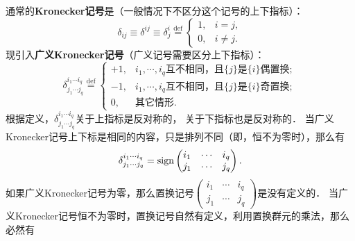 通常的{\bfseries Kronecker记号}是（一般情况下不区分这个记号的上下指标）：
\begin{equation}\label{chmla:eqn_ukd}
    \delta_{ij}\equiv \delta^{ij} \equiv \delta_{j}^{i} \overset{\mathrm {def}}{=}
    \begin{cases}
        1, & i=j, \\
        0, & i\neq j.
    \end{cases}
\end{equation}
现引入{\bfseries 广义Kronecker记号}（广义记号需要区分上下指标）： 
\begin{equation}\label{chmla:eqn_gkd}
    \delta_{j_1 \cdots j_q}^{i_1 \cdots i_q} \overset{\mathrm {def}}{=}
    \begin{cases}
        +1, & \text{$i_1,  \cdots, i_q$互不相同，且$\{ j\} $是$\{i\}$偶置换}; \\
        -1, & \text{$i_1,  \cdots, i_q$互不相同，且$\{ j\} $是$\{i\}$奇置换}; \\
        0,  & \text{其它情形}.
    \end{cases}
\end{equation}
根据定义，$\delta_{j_1 \cdots j_q}^{i_1 \cdots i_q}$关于上指标是反对称的，
关于下指标也是反对称的．
当广义Kronecker记号上下标是相同的内容，只是排列不同（即，恒不为零时），那么有
\begin{equation}\label{chmla:eqn_sign-p}
    \delta_{j_1 \cdots j_q}^{i_1 \cdots i_q} =
    {\rm sign}\begin{pmatrix}
        i_1 &\cdots &i_q \\ j_1 &\cdots &j_q
    \end{pmatrix} .
\end{equation}
如果广义Kronecker记号为零，那么置换记号$(\begin{smallmatrix}
    i_1 &\cdots &i_q \\ j_1 &\cdots &j_q \end{smallmatrix})$是没有定义的．
当广义Kronecker记号恒不为零时，置换记号自然有定义，利用置换群元的乘法，那么必然有
